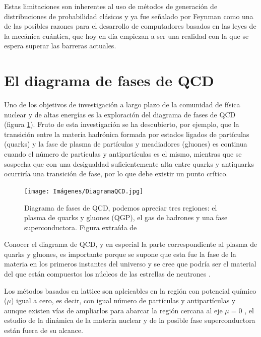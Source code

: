 \documentclass[a4paper,10pt]{article}
\begin{document}
\begin{multicols}{2}
Estas limitaciones son inherentes al uso de métodos de generación de distribuciones de probabilidad clásicos y ya fue señalado por Feynman \cite{feynman_simulating_1982} como una de las posibles razones para el desarrollo de computadores basados en las leyes de la mecánica cuántica, que hoy en día empiezan a ser una realidad con la que se espera superar las barreras actuales.

\section{El diagrama de fases de QCD}
Uno de los objetivos de investigación a largo plazo de la comunidad de física nuclear y de altas energías es la exploración del diagrama de fases de QCD (figura \ref{QCDphase}). Fruto de esta investigación se ha descubierto, por ejemplo, que la transición entre la materia hadrónica formada por estados ligados de partículas (quarks) y la fase de plasma de partículas y meadiadores (gluones) es continua cuando el número de partículas y antipartículas es el mismo, mientras que se sospecha que con una desigualdad suficientemente alta entre quarks y antiquarks ocurriría una transición de fase, por lo que debe existir un punto crítico.

\begin{figure}[H]
\begin{center}
\texttt{[image: Imágenes/DiagramaQCD.jpg]}
\end{center}
\caption{Diagrama de fases de QCD, podemos apreciar tres regiones: el plasma de quarks y gluones (QGP), el gas de hadrones y una fase superconductora. Figura extraída de \cite{usqcd_collaboration_hot-dense_2019}}
\label{QCDphase}
\end{figure}

Conocer el diagrama de QCD, y en especial la parte correspondiente al plasma de quarks y gluones, es importante porque se supone que esta fue la fase de la materia en los primeros instantes del universo y se cree que podría ser el material del que están compuestos los núcleos de las estrellas de neutrones \cite{busza_heavy_2018}.

Los métodos basados en lattice son aplcicables en la región con potencial químico ($\mu$) igual a cero, es decir, con igual número de partículas y antipartículas y aunque existen vías de ampliarlos para abarcar la región cercana al eje $\mu=0$ \cite{usqcd_collaboration_hot-dense_2019}, el estudio de la dinámica de la materia nuclear y de la posible fase superconductora están fuera de su alcance.


\end{multicols}
\end{document}
